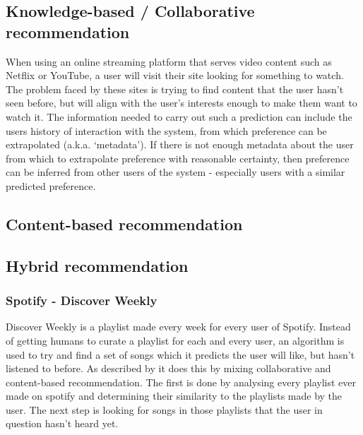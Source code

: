 \documentclass[a4paper,12pt]{article}
\begin{document}
  \subsection{Knowledge-based / Collaborative recommendation}
    When using an online streaming platform that serves video content such as Netflix or YouTube, a user will visit their site looking for something to watch. The problem faced by these sites is trying to find content that the user hasn't seen before, but will align with the user's interests enough to make them want to watch it.
    The information needed to carry out such a prediction can include the users history of interaction with the system, from which preference can be extrapolated (a.k.a. ‘metadata’). If there is not enough metadata about the user from which to extrapolate preference with reasonable certainty, then preference can be inferred from other users of the system - especially users with a similar predicted preference.

  \subsection{Content-based recommendation}

  \subsection{Hybrid recommendation}

    \subsubsection{Spotify - Discover Weekly}
      Discover Weekly is a playlist made every week for every user of Spotify. Instead of getting humans to curate a playlist for each and every user, an algorithm is used to try and find a set of songs which it predicts the user will like, but hasn't listened to before. As described by \cite{popper2015dw} it does this by mixing collaborative and content-based recommendation. The first is done by analysing every playlist ever made on spotify and determining their similarity to the playlists made by the user. The next step is looking for songs in those playlists that the user in question hasn't heard yet.
\end{document}
